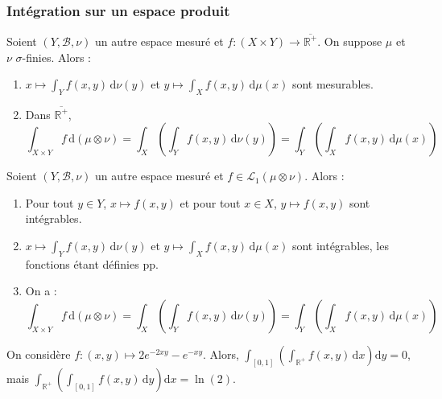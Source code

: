   \subsubsection{Intégration sur un espace produit}


  \begin{theorem}
    Soient $(Y, \mathcal{B}, \nu)$ un autre espace mesuré et $f : (X \times Y) \rightarrow \overline{\mathbb{R}^+}$. On suppose $\mu$ et $\nu$ $\sigma$-finies. Alors :
    \begin{enumerate}[label=(\roman*)]
      \item $x \mapsto \int_Y f(x,y) \, \mathrm{d}\nu(y)$ et $y \mapsto \int_X f(x,y) \, \mathrm{d}\mu(x)$ sont mesurables.
      \item Dans $\overline{\mathbb{R}^+}$,
      \[ \int_{X \times Y} f \, \mathrm{d}(\mu \otimes \nu) = \int_X \left( \int_Y f(x,y) \, \mathrm{d}\nu(y) \right) = \int_Y \left( \int_X f(x,y) \, \mathrm{d}\mu(x) \right) \]
    \end{enumerate}
  \end{theorem}

  \begin{theorem}
    Soient $(Y, \mathcal{B}, \nu)$ un autre espace mesuré et $f \in \mathcal{L}_1 (\mu \otimes \nu)$. Alors :
    \begin{enumerate}[label=(\roman*)]
      \item Pour tout $y \in Y$, $x \mapsto f(x,y)$ et pour tout $x \in X$, $y \mapsto f(x,y)$ sont intégrables.
      \item $x \mapsto \int_Y f(x,y) \, \mathrm{d}\nu(y)$ et $y \mapsto \int_X f(x,y) \, \mathrm{d}\mu(x)$ sont intégrables, les fonctions étant définies pp.
      \item On a :
      \[ \int_{X \times Y} f \, \mathrm{d}(\mu \otimes \nu) = \int_X \left( \int_Y f(x,y) \, \mathrm{d}\nu(y) \right) = \int_Y \left( \int_X f(x,y) \, \mathrm{d}\mu(x) \right) \]
    \end{enumerate}
  \end{theorem}

  \begin{cexample}
    On considère $f : (x,y) \mapsto 2e^{-2xy} - e^{-xy}$. Alors, $\int_{[0,1]} \left( \int_{\mathbb{R}^+} f(x,y) \, \mathrm{d}x \right) \mathrm{d}y = 0$, mais $\int_{\mathbb{R}^+} \left( \int_{[0,1]} f(x,y) \, \mathrm{d}y \right) \mathrm{d}x = \ln(2)$.
  \end{cexample}

